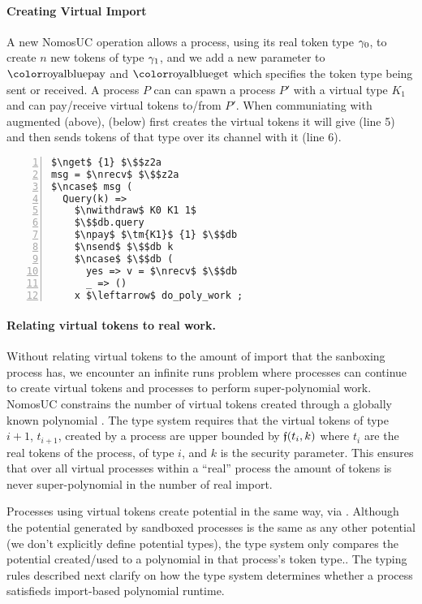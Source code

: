 \paragraph{Creating Virtual Import}
A new NomosUC operation  allows a process, using its real token type $\gamma_0$, to create $n$ new tokens of type $\gamma_1$, and we add a new parameter to $\npay$ and $\nget$ which specifies the token type being sent or received. 
A process $P$ can can spawn a process $P'$ with a virtual type $K_1$ and can pay/receive virtual tokens to/from $P'$.
When communiating with augmented \Fdb (above), \Sim (below) first creates the virtual tokens it will give \Fdb (line 5) and then sends tokens of that type over its channel with it (line 6).
\begin{lstlisting}[basicstyle=\scriptsize\BeraMonottFamily, frame=single, mathescape, numbers=left, xleftmargin=2em, xrightmargin=2em]
$\nget$ {1} $\$$z2a
msg = $\nrecv$ $\$$z2a
$\ncase$ msg (
  Query(k) => 
    $\nwithdraw$ K0 K1 1$
    $\$$db.query
    $\npay$ $\tm{K1}$ {1} $\$$db
    $\nsend$ $\$$db k
    $\ncase$ $\$$db (
      yes => v = $\nrecv$ $\$$db 
      _ => ()
    x $\leftarrow$ do_poly_work ;
\end{lstlisting}

\paragraph{Relating virtual tokens to real work.}
Without relating virtual tokens to the amount of import that the sanboxing process has, we encounter an infinite runs problem where processes can continue to create virtual tokens and processes to perform super-polynomial work.
NomosUC constrains the number of virtual tokens created through a globally known polynomial \GlobalF.
The type system requires that the virtual tokens of type $i+1$, $t_{i+1}$, created by a process are upper bounded by $\mathfrak{f}(t_i, k)$ where $t_i$ are the real tokens of the process, of type $i$, and $k$ is the security parameter. 
This ensures that over all virtual processes within a ``real'' process the amount of tokens is never super-polynomial in the number of real import.

Processes using virtual tokens create potential in the same way, via \inline{$\ngenpot$}. 
Although the potential generated by sandboxed processes is the same as any other potential (we don't explicitly define potential types), the type system only compares the potential created/used to a polynomial in that process's token type.. 
The typing rules described next clarify on how the type system determines whether a process satisfieds import-based polynomial runtime.

